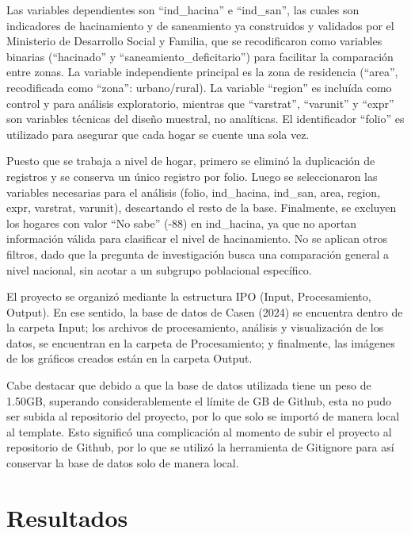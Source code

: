 \documentclass[
  spanish,
  a4paper,
  oneside]{scrbook}
\begin{document}
Las variables dependientes son ``ind\_hacina'' e ``ind\_san'', las
cuales son indicadores de hacinamiento y de saneamiento ya construidos y
validados por el Ministerio de Desarrollo Social y Familia, que se
recodificaron como variables binarias (``hacinado'' y
``saneamiento\_deficitario'') para facilitar la comparación entre zonas.
La variable independiente principal es la zona de residencia (``area'',
recodificada como ``zona'': urbano/rural). La variable ``region'' es
incluída como control y para análisis exploratorio, mientras que
``varstrat'', ``varunit'' y ``expr'' son variables técnicas del diseño
muestral, no analíticas. El identificador ``folio'' es utilizado para
asegurar que cada hogar se cuente una sola vez.

Puesto que se trabaja a nivel de hogar, primero se eliminó la
duplicación de registros y se conserva un único registro por folio.
Luego se seleccionaron las variables necesarias para el análisis (folio,
ind\_hacina, ind\_san, area, region, expr, varstrat, varunit),
descartando el resto de la base. Finalmente, se excluyen los hogares con
valor ``No sabe'' (-88) en ind\_hacina, ya que no aportan información
válida para clasificar el nivel de hacinamiento. No se aplican otros
filtros, dado que la pregunta de investigación busca una comparación
general a nivel nacional, sin acotar a un subgrupo poblacional
específico.

El proyecto se organizó mediante la estructura IPO (Input,
Procesamiento, Output). En ese sentido, la base de datos de Casen (2024)
se encuentra dentro de la carpeta Input; los archivos de procesamiento,
análisis y visualización de los datos, se encuentran en la carpeta de
Procesamiento; y finalmente, las imágenes de los gráficos creados están
en la carpeta Output.

Cabe destacar que debido a que la base de datos utilizada tiene un peso
de 1.50GB, superando considerablemente el límite de GB de Github, esta
no pudo ser subida al repositorio del proyecto, por lo que solo se
importó de manera local al template. Esto significó una complicación al
momento de subir el proyecto al repositorio de Github, por lo que se
utilizó la herramienta de Gitignore para así conservar la base de datos
solo de manera local.


\chapter{Resultados}\label{resultados}
\end{document}
